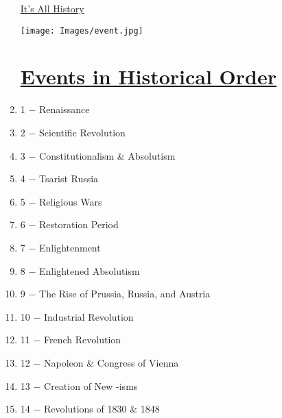 \documentclass[12pt]{article}
\begin{document}
\begin{enumerate}
\begin{tabular}{p{} p{} p{} p{} p{}}
\end{tabular}

\newpage
\begin{center}
\end{center}
\begin{center}
\end{center}
\begin{center}
\underline{\Huge It's All History}
\end{center}
\vspace{50pt}
\begin{center}
\texttt{[image: Images/event.jpg]}
\end{center}
\newpage

\section{\underline{Events in Historical Order}}

\item 1 $-$ Renaissance

\item 2 $-$ Scientific Revolution

\item 3 $-$ Constitutionalism \& Absolutism

\item 4 $-$ Tsarist Russia 
  
\item 5 $-$ Religious Wars

\item 6 $-$ Restoration Period

\item 7 $-$ Enlightenment

\item 8 $-$ Enlightened Absolutism

\item 9 $-$ The Rise of Prussia, Russia, and Austria

\item 10 $-$ Industrial Revolution

\item 11 $-$ French Revolution

\item 12 $-$ Napoleon \& Congress of Vienna

\item 13 $-$ Creation of New -isms

\item 14 $-$ Revolutions of 1830 \& 1848


\end{enumerate}
\end{document}

